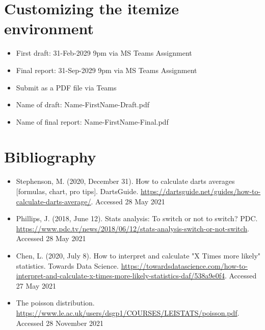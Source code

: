 \documentclass[footheight=20pt, footsepline, headheight=20pt, headsepline]{scrartcl}
\begin{document}
\section{Customizing the itemize environment}
    \begin{itemize}
        \item First draft: 31-Feb-2029 9pm via MS Teams Assignment
        \item[$\circ$] Final report: 31-Sep-2029 9pm via MS Teams Assignment
        \item[$\ast$] Submit as a PDF file via Teams
        \item[$-$] Name of draft: Name-FirstName-Draft.pdf
        \item[$\square$] Name of final report: Name-FirstName-Final.pdf
    \end{itemize}
\newpage
\section{Bibliography}
\begin{itemize}
    \item Stephenson, M. (2020, December 31). How to calculate darts averages [formulas, chart, pro tips]. DartsGuide. \url{https://dartsguide.net/guides/how-to-calculate-darts-average/}. Accessed 28 May 2021 
    \item Phillips, J. (2018, June 12). Stats analysis: To switch or not to switch? PDC. \url{https://www.pdc.tv/news/2018/06/12/stats-analysis-switch-or-not-switch}. Accessed 28 May 2021 
    \item Chen, L. (2020, July 8). How to interpret and calculate "X Times more likely" statistics. Towards Data Science. \url{https://towardsdatascience.com/how-to-interpret-and-calculate-x-times-more-likely-statistics-daf/538a9e0f4}. Accessed 27 May 2021 
    \item The poisson distribution. \url{https://www.le.ac.uk/users/dsgp1/COURSES/LEISTATS/poisson.pdf}. Accessed 28 November 2021 
\end{itemize}
\end{document}
